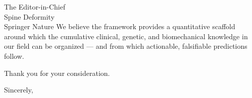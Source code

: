 \documentclass[12pt]{letter}
\begin{document}
\begin{letter}{The Editor-in-Chief\\Spine Deformity\\Springer Nature}
We believe the framework provides a quantitative scaffold around which the cumulative clinical, genetic, and biomechanical knowledge in our field can be organized --- and from which actionable, falsifiable predictions follow.

Thank you for your consideration.

\closing{Sincerely,}

\end{letter}
\end{document}
